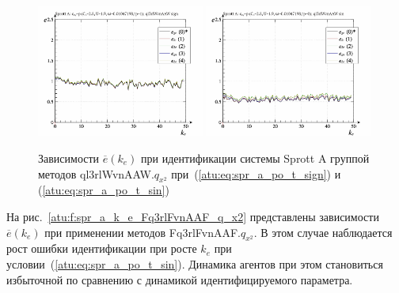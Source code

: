 \begin{figure}[htb!]
  \centerline{
    \includegraphics[width=0.49\textwidth]{p/cha/spr_a/ql3rlWvnAAW_x2/sprott_a_id-p_k_e_sign.png}
    \hfill
    \includegraphics[width=0.49\textwidth]{p/cha/spr_a/ql3rlWvnAAW_x2/sprott_a_id-p_k_e_sin.png}
  }
  \caption{Зависимости $\overline{e}(k_e)$ при идентификации системы Sprott A группой методов ql3rlWvnAAW.$q_{x^2}$
   при~(\ref{atu:eq:spr_a_po_t_sign}) и (\ref{atu:eq:spr_a_po_t_sin})}
  \label{atu:f:spr_a_k_e_ql3rlWvnAAW_q_x2}
\end{figure}

На рис.~\ref{atu:f:spr_a_k_e_Fq3rlFvnAAF_q_x2} представлены зависимости
$\overline{e}(k_e)$ при применении методов Fq3rlFvnAAF.$q_{x^2}$.
В этом случае наблюдается рост ошибки идентификации при росте $k_e$
при условии~(\ref{atu:eq:spr_a_po_t_sin}). Динамика агентов при этом
становиться избыточной по сравнению с динамикой идентифицируемого параметра.


